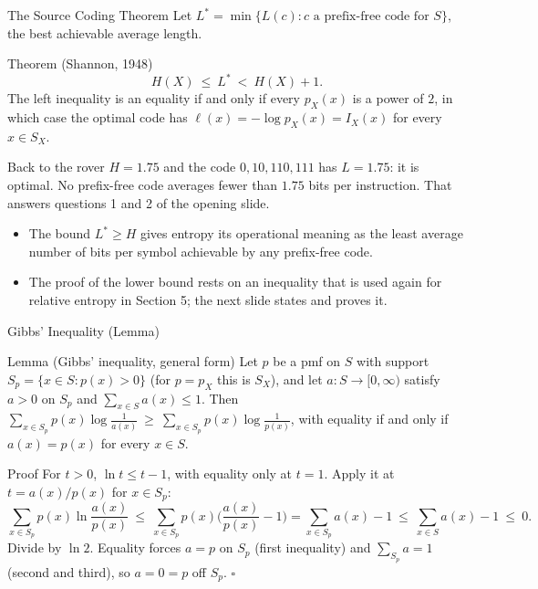 \begin{frame}{The Source Coding Theorem}
  \small
  Let $L^*=\min\{L(c): c\text{ a prefix-free code for }S\}$, the best achievable average length.
  \begin{block}{Theorem (Shannon, 1948)}
    \[
      H(X)\ \le\ L^*\ <\ H(X)+1 .
    \]
    The left inequality is an equality if and only if every $p_X(x)$ is a power of $2$, in which case the optimal code has $\ell(x)=-\log p_X(x)=I_X(x)$ for every $x\in S_X$.
  \end{block}
  \begin{exampleblock}{Back to the rover}
    $H=1.75$ and the code $0,10,110,111$ has $L=1.75$: it is optimal. No prefix-free code averages fewer than $1.75$ bits per instruction. That answers questions 1 and 2 of the opening slide.
  \end{exampleblock}
  \begin{itemize}
    \item The bound $L^*\ge H$ gives entropy its operational meaning as the least average number of bits per symbol achievable by any prefix-free code.
    \item The proof of the lower bound rests on an inequality that is used again for relative entropy in Section 5; the next slide states and proves it.
  \end{itemize}
\end{frame}

\begin{frame}{Gibbs' Inequality (Lemma)}
  \small
  \begin{block}{Lemma (Gibbs' inequality, general form)}
    Let $p$ be a pmf on $S$ with support $S_p=\{x\in S:p(x)>0\}$ (for $p=p_X$ this is $S_X$), and let $a\colon S\to[0,\infty)$ satisfy $a>0$ on $S_p$ and $\sum_{x\in S}a(x)\le1$. Then
    $\displaystyle\sum_{x\in S_p}p(x)\log\frac1{a(x)}\ \ge\ \sum_{x\in S_p}p(x)\log\frac1{p(x)}$,
    with equality if and only if $a(x)=p(x)$ for every $x\in S$.
  \end{block}
  \begin{block}{Proof}
    For $t>0$, $\ln t\le t-1$, with equality only at $t=1$. Apply it at $t=a(x)/p(x)$ for $x\in S_p$:
    \[
      \sum_{x\in S_p}p(x)\ln\frac{a(x)}{p(x)}\ \le\ \sum_{x\in S_p}p(x)\Big(\frac{a(x)}{p(x)}-1\Big)=\sum_{x\in S_p}a(x)-1\ \le\ \sum_{x\in S}a(x)-1\ \le\ 0 .
    \]
    Divide by $\ln2$. Equality forces $a=p$ on $S_p$ (first inequality) and $\sum_{S_p}a=1$ (second and third), so $a=0=p$ off $S_p$. \hfill$\square$
  \end{block}
\end{frame}

